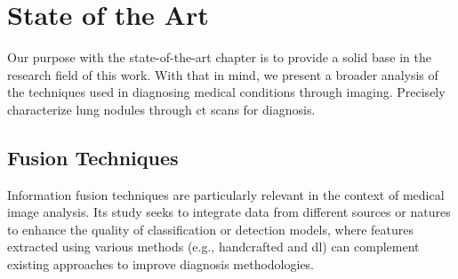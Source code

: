 




\chapter{State of the Art}\label{chap:sota}
Our purpose with the state-of-the-art chapter is to provide a solid base in the research field of this work. With that in mind, we present a broader analysis of the techniques used in diagnosing medical conditions through imaging. Precisely characterize lung nodules through \ac{ct} scans for diagnosis.

\section{Fusion Techniques}
Information fusion techniques are particularly relevant in the context of medical image analysis. Its study seeks to integrate data from different sources or natures to enhance the quality of classification or detection models, where features extracted using various methods (e.g., handcrafted and \ac{dl}) can complement existing approaches to improve diagnosis methodologies.

